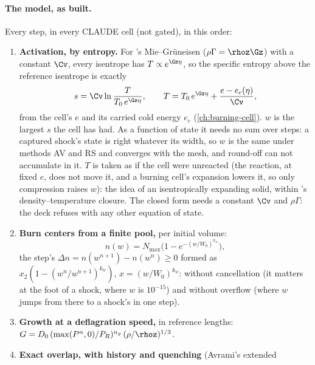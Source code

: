 \paragraph{The model, as built.} Every step, in every CLAUDE cell (not
gated), in this order:
\begin{enumerate}
\item \textbf{Activation, by entropy.} For \bw's Mie--Gr\"uneisen ($\rho\Gamma
  = \rhoz\Gz$) with a constant $\Cv$, every isentrope has $T \propto
  e^{\Gz\eta}$, so the specific entropy above the reference isentrope is
  exactly
  \begin{equation}
    s = \Cv\ln\frac{T}{T_0\,e^{\Gz\eta}}, \qquad
    T = T_0\,e^{\Gz\eta} + \frac{e - e_c(\eta)}{\Cv},
    \label{eq:claude-s}
  \end{equation}
  from the cell's $e$ and its carried cold energy $e_c$
  (\cref{ch:burning-cell}). $w$ is the largest $s$ the cell has had. As a
  function of state it needs no sum over steps: a captured shock's state is
  right whatever its width, so $w$ is the same under methods AV and RS and
  converges with the mesh, and round-off can not accumulate in it. $T$ is
  taken as if the cell were unreacted (the reaction, at fixed $e$, does not
  move it, and a burning cell's expansion lowers it, so only compression
  raises $w$): the idea of an isentropically expanding solid, within
  \bw's density--temperature closure. The closed form needs a constant
  $\Cv$ and $\rho\Gamma$: the deck refuses  with any
  other equation of state.
\item \textbf{Burn centers from a finite pool,} per initial volume:
  \begin{equation}
    n(w) = N_{\max}\bigl(1 - e^{-(w/W_0)^{k_w}}\bigr),
    \label{eq:claude-n}
  \end{equation}
  the step's $\Delta n = n(w^{n+1}) - n(w^n) \ge 0$ formed as $x_2(1 -
  (w^n/w^{n+1})^{k_w})$, $x = (w/W_0)^{k_w}$: without cancellation (it
  matters at the foot of a shock, where $w$ is $10^{-15}$) and without
  overflow (where $w$ jumps from there to a shock's in one step).
\item \textbf{Growth at a deflagration speed,} in reference lengths:
  $G = D_0\,(\max(P^n, 0)/P_R)^{n_g}\,(\rho/\rhoz)^{1/3}$.
\item \textbf{Exact overlap, with history and quenching} (Avrami's extended

\end{enumerate}
